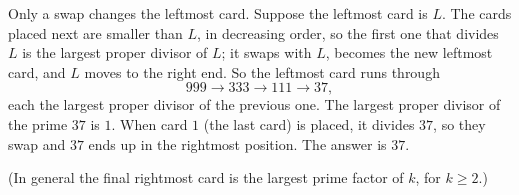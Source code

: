 Only a swap changes the leftmost card. Suppose the leftmost card is $L$. The cards placed next are smaller than $L$, in decreasing order, so the first one that divides $L$ is the largest proper divisor of $L$; it swaps with $L$, becomes the new leftmost card, and $L$ moves to the right end. So the leftmost card runs through
\[999\to333\to111\to37,\]
each the largest proper divisor of the previous one. The largest proper divisor of the prime $37$ is $1$. When card $1$ (the last card) is placed, it divides $37$, so they swap and $37$ ends up in the rightmost position. The answer is $\boxed{37}$.

(In general the final rightmost card is the largest prime factor of $k$, for $k\ge2$.)
